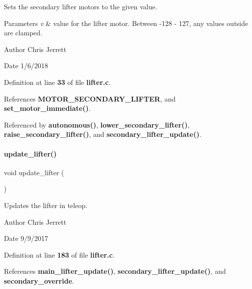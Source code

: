 Sets the secondary lifter motors to the given value. 


\begin{DoxyParams}{Parameters}
{\em v} & value for the lifter motor. Between -\/128 -\/ 127, any values outside are clamped. \\
\hline
\end{DoxyParams}
\begin{DoxyAuthor}{Author}
Chris Jerrett 
\end{DoxyAuthor}
\begin{DoxyDate}{Date}
1/6/2018 
\end{DoxyDate}


Definition at line \textbf{ 33} of file \textbf{ lifter.\+c}.



References \textbf{ M\+O\+T\+O\+R\+\_\+\+S\+E\+C\+O\+N\+D\+A\+R\+Y\+\_\+\+L\+I\+F\+T\+ER}, and \textbf{ set\+\_\+motor\+\_\+immediate()}.



Referenced by \textbf{ autonomous()}, \textbf{ lower\+\_\+secondary\+\_\+lifter()}, \textbf{ raise\+\_\+secondary\+\_\+lifter()}, and \textbf{ secondary\+\_\+lifter\+\_\+update()}.

\mbox{\label{lifter_8c_a59bb7413777ca16aba124aaedf95c79b}} 
\paragraph{update\+\_\+lifter()}
{\footnotesize\ttfamily void update\+\_\+lifter (\begin{DoxyParamCaption}{ }\end{DoxyParamCaption})}



Updates the lifter in teleop. 

\begin{DoxyAuthor}{Author}
Chris Jerrett 
\end{DoxyAuthor}
\begin{DoxyDate}{Date}
9/9/2017 
\end{DoxyDate}


Definition at line \textbf{ 183} of file \textbf{ lifter.\+c}.



References \textbf{ main\+\_\+lifter\+\_\+update()}, \textbf{ secondary\+\_\+lifter\+\_\+update()}, and \textbf{ secondary\+\_\+override}.



